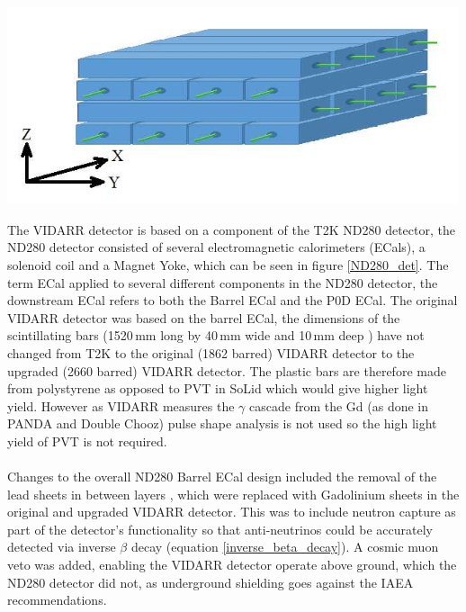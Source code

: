 \documentclass[12pt,a4paper]{article}
\newenvironment{Figure}
  {\par\medskip\noindent\minipage{\linewidth}}
  {\endminipage\par\medskip}
\begin{document}
\begin{Figure}
 \centering
 \includegraphics[height=58mm]{VIDARR_diagram.jpeg}
 \label{VIDARR_diagram}
\end{Figure}
The VIDARR detector is based on a component of the T2K ND280 detector, the ND280 detector consisted of several electromagnetic calorimeters (ECals), a solenoid coil and a Magnet Yoke, which can be seen in figure \ref{ND280_det}. The term ECal applied to several different components in the ND280 detector, the downstream ECal refers to both the Barrel ECal and the P0D ECal. The original VIDARR detector was based on the barrel ECal, the dimensions of the scintillating bars (1520\,mm long by 40\,mm wide and 10\,mm deep \cite{t2k_ecal}) have not changed from T2K to the original (1862 barred) VIDARR detector to the upgraded (2660 barred) VIDARR detector. The plastic bars are therefore made from polystyrene \cite{t2k_ecal} as opposed to PVT in SoLid which would give higher light yield. However as VIDARR measures the $\gamma$ cascade from the Gd (as done in PANDA and Double Chooz) pulse shape analysis is not used so the high light yield of PVT is not required.\\\\
Changes to the overall ND280 Barrel ECal design included the removal of the lead sheets in between layers \cite{t2k_ecal}, which were replaced with Gadolinium sheets in the original and upgraded VIDARR detector. This was to include neutron capture as part of the detector's functionality so that anti-neutrinos could be accurately detected via inverse $\beta$ decay (equation \ref{inverse_beta_decay}). A cosmic muon veto was added, enabling the VIDARR detector operate above ground, which the ND280 detector did not, as underground shielding goes against the IAEA recommendations. 
\end{document}
